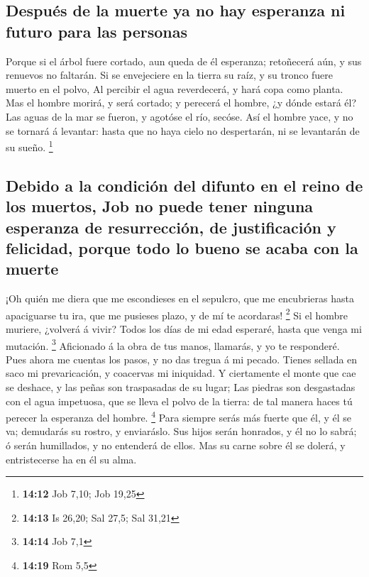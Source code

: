 \hypertarget{despuuxe9s-de-la-muerte-ya-no-hay-esperanza-ni-futuro-para-las-personas}{%
\subsection{Después de la muerte ya no hay esperanza ni futuro para las
personas}\label{despuuxe9s-de-la-muerte-ya-no-hay-esperanza-ni-futuro-para-las-personas}}

 Porque si el árbol fuere cortado, aun queda de él
esperanza; retoñecerá aún, y sus renuevos no faltarán.  Si
se envejeciere en la tierra su raíz, y su tronco fuere muerto en el
polvo,  Al percibir el agua reverdecerá, y hará copa como
planta.  Mas el hombre morirá, y será cortado; y perecerá
el hombre, ¿y dónde estará él?  Las aguas de la mar se
fueron, y agotóse el río, secóse.  Así el hombre yace, y
no se tornará á levantar: hasta que no haya cielo no despertarán, ni se
levantarán de su sueño. \footnote{\textbf{14:12} Job 7,10; Job 19,25}

\hypertarget{debido-a-la-condiciuxf3n-del-difunto-en-el-reino-de-los-muertos-job-no-puede-tener-ninguna-esperanza-de-resurrecciuxf3n-de-justificaciuxf3n-y-felicidad-porque-todo-lo-bueno-se-acaba-con-la-muerte}{%
\subsection{Debido a la condición del difunto en el reino de los
muertos, Job no puede tener ninguna esperanza de resurrección, de
justificación y felicidad, porque todo lo bueno se acaba con la
muerte}\label{debido-a-la-condiciuxf3n-del-difunto-en-el-reino-de-los-muertos-job-no-puede-tener-ninguna-esperanza-de-resurrecciuxf3n-de-justificaciuxf3n-y-felicidad-porque-todo-lo-bueno-se-acaba-con-la-muerte}}

 ¡Oh quién me diera que me escondieses en el sepulcro,
que me encubrieras hasta apaciguarse tu ira, que me pusieses plazo, y de
mí te acordaras! \footnote{\textbf{14:13} Is 26,20; Sal 27,5; Sal 31,21}
 Si el hombre muriere, ¿volverá á vivir? Todos los días
de mi edad esperaré, hasta que venga mi mutación. \footnote{\textbf{14:14}
  Job 7,1}  Aficionado á la obra de tus manos, llamarás,
y yo te responderé.  Pues ahora me cuentas los pasos, y
no das tregua á mi pecado.  Tienes sellada en saco mi
prevaricación, y coacervas mi iniquidad.  Y ciertamente
el monte que cae se deshace, y las peñas son traspasadas de su lugar;
 Las piedras son desgastadas con el agua impetuosa, que
se lleva el polvo de la tierra: de tal manera haces tú perecer la
esperanza del hombre. \footnote{\textbf{14:19} Rom 5,5} 
Para siempre serás más fuerte que él, y él se va; demudarás su rostro, y
enviaráslo.  Sus hijos serán honrados, y él no lo sabrá;
ó serán humillados, y no entenderá de ellos.  Mas su
carne sobre él se dolerá, y entristecerse ha en él su alma.

